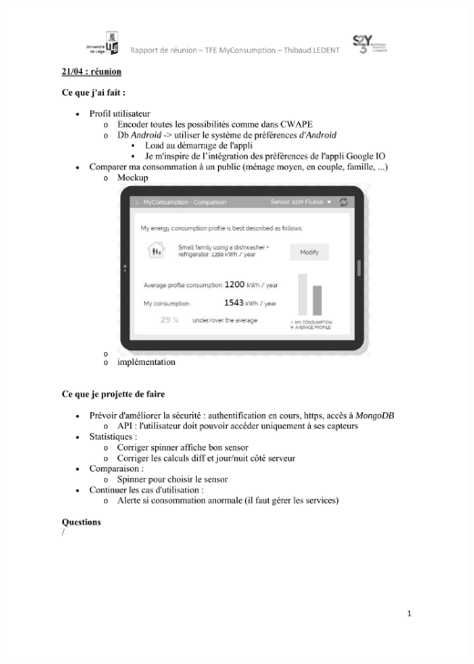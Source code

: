 \documentclass[a4paper, oneside, 11pt]{book}
\begin{document}
\includegraphics[width=1\textwidth]{reports_NB_Part14.pdf}
\newpage
\end{document}
